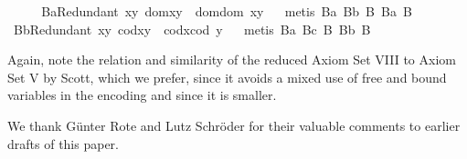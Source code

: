 \begin{isabellebody}
%
\endisadelimproof
\ \isanewline
\ \ \isamarkupfalse%
\ B{}aRedundant{\isacharcolon}\ {\isachardoublequoteopen}\isactrlbold {\isasymforall}x{\isachardot}\isactrlbold {\isasymforall}y{\isachardot}\ dom{\isacharparenleft}x{\isasymcdot}y{\isacharparenright}\ {\isasymcong}\ dom{\isacharparenleft}{\isacharparenleft}dom\ x{\isacharparenright}{\isasymcdot}y{\isacharparenright}{\isachardoublequoteclose}%
\isadelimproof
\ %
\endisadelimproof
%
\isatagproof
{}\isamarkupfalse%
\ {\isacharparenleft}metis\ B{}a\ B{}b\ B{}\ B{}a\ B{}{\isacharparenright}%
\endisatagproof
{\isafoldproof}%
%
\isadelimproof
%
\endisadelimproof
\ \isanewline
\ \ \isamarkupfalse%
\ B{}bRedundant{\isacharcolon}\ {\isachardoublequoteopen}\isactrlbold {\isasymforall}x{\isachardot}\isactrlbold {\isasymforall}y{\isachardot}\ cod{\isacharparenleft}x{\isasymcdot}y{\isacharparenright}\ {\isasymcong}\ cod{\isacharparenleft}x{\isasymcdot}{\isacharparenleft}cod\ y{\isacharparenright}{\isacharparenright}{\isachardoublequoteclose}%
\isadelimproof
\ %
\endisadelimproof
%
\isatagproof
{}\isamarkupfalse%
\ {\isacharparenleft}metis\ B{}a\ B{}c\ B{}\ B{}b\ B{}{\isacharparenright}%
\endisatagproof
{\isafoldproof}%
%
\isadelimproof
%
\endisadelimproof
%
\begin{isamarkuptext}%
Again, note the relation and similarity of the reduced Axiom Set VIII to Axiom Set V by Scott, 
which we prefer, since it avoids a mixed use of free and bound variables in the encoding and 
since it is smaller.%
\end{isamarkuptext}\isamarkuptrue%
%
\isamarkuptrue%
%
\begin{isamarkuptext}%
We thank G\"unter Rote and Lutz Schr\"oder for their valuable comments to earlier drafts of this paper.%
\end{isamarkuptext}\isamarkuptrue%
%
\isadelimtheory
%
\endisadelimtheory
%
\isatagtheory
%
\endisatagtheory
{\isafoldtheory}%
%
\isadelimtheory
%
\endisadelimtheory
%
\end{isabellebody}%
